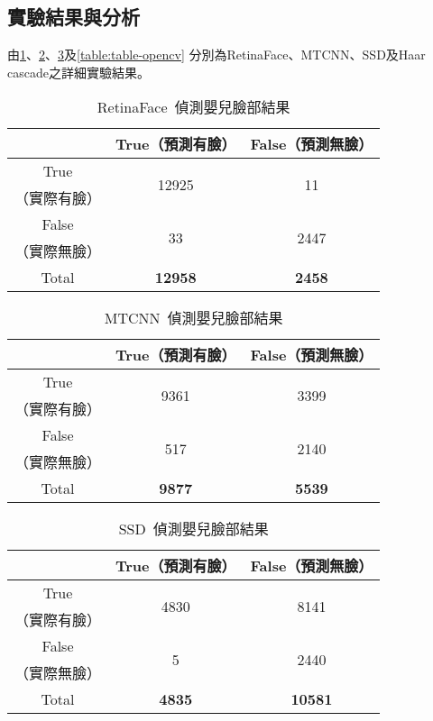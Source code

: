 \documentclass[class=NCU_thesis, crop=false]{standalone}
\begin{document}
\subsection{實驗結果與分析}
由\cref{table:table-retinaface}、\cref{table:table-mtcnn}、\cref{table:table-ssd}及\cref{table:table-opencv}
分別為RetinaFace、MTCNN、SSD及Haar cascade之詳細實驗結果。

\begin{table}[h]
    \centering
    \caption{RetinaFace~\cite{deng_retinaface_2020}偵測嬰兒臉部結果}
    \label{table:table-retinaface}
    \begin{tabular}{ccc}
    \hline
     & True（預測有臉）& False（預測無臉）\\
    \hline
    True & \multirow{2}{*}{12925} & \multirow{2}{*}{11} \\
    （實際有臉）& & \\
    False & \multirow{2}{*}{33} & \multirow{2}{*}{2447} \\
    （實際無臉）&  & \\
    \hline
    Total & \textbf{12958} & \textbf{2458} \\
    \hline
    \end{tabular}
\end{table}

\begin{table}[h]
    \centering
    \caption{MTCNN~\cite{zhang_joint_2016}偵測嬰兒臉部結果}
    \label{table:table-mtcnn}
    \begin{tabular}{ccc}
    \hline
     & True（預測有臉）& False（預測無臉）\\
    \hline
    True & \multirow{2}{*}{9361} & \multirow{2}{*}{3399} \\
    （實際有臉）& & \\
    False & \multirow{2}{*}{517} & \multirow{2}{*}{2140} \\
    （實際無臉）&  & \\
    \hline
    Total & \textbf{9877} & \textbf{5539} \\
    \hline
    \end{tabular}
\end{table}

\begin{table}[h]
    \centering
    \caption{SSD~\cite{ye_face_2021}偵測嬰兒臉部結果}
    \label{table:table-ssd}
    \begin{tabular}{ccc}
    \hline
     & True（預測有臉）& False（預測無臉）\\
    \hline
    True & \multirow{2}{*}{4830} & \multirow{2}{*}{8141} \\
    （實際有臉）& & \\
    False & \multirow{2}{*}{5} & \multirow{2}{*}{2440} \\
    （實際無臉）&  & \\
    \hline
    Total & \textbf{4835} & \textbf{10581} \\
    \hline
    \end{tabular}
\end{table}
\end{document}
